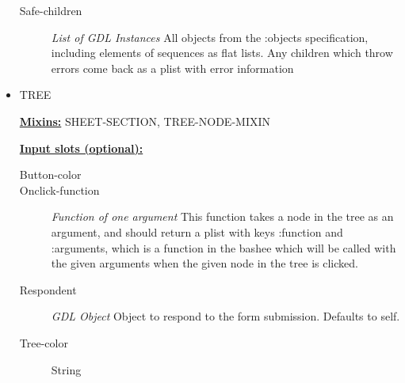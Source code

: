 \documentclass [11pt]{book}
\begin{document}
\begin{itemize}
\begin{description}
\item [Safe-children]
\emph{List of GDL Instances} All objects from the :objects specification, including elements of sequences
as flat lists. Any children which throw errors come back as a plist with error information


\end{description}







\item {}TREE


\textbf{
\underline{Mixins:}} SHEET-SECTION, TREE-NODE-MIXIN





\begin{description}

\end{description}








\textbf{
\underline{Input slots (optional):}}

\begin{description}

\item [Button-color]

\item [Onclick-function]
\emph{Function of one argument} This function takes a node in the tree as an argument, and should return
a plist with keys :function and :arguments, which is a function in the bashee which will be called
with the given arguments when the given node in the tree is clicked.


\item [Respondent]
\emph{GDL Object} Object to respond to the form submission. Defaults to self.


\item [Tree-color]
String


\end{description}







\end{itemize}
\end{document}

